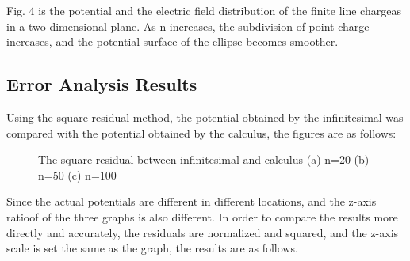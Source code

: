 \documentclass[journal,twocolumn,letterpaper]{IEEEJERM}
\begin{document}
Fig. 4 is the potential and the electric field distribution of the finite line chargeas in a two-dimensional plane. As n increases, the subdivision of point charge increases, and the potential surface of the ellipse becomes smoother. 

\subsection{Error Analysis Results}
Using the square residual method, the potential obtained by the infinitesimal was compared with the potential obtained by the calculus, the figures are as follows:
\begin{figure}[H]   
	\centering	  
	    \label{51}\hfill	  
	\label{52}\hfill
	    \label{53}\hfill	  
	\caption{The square residual between infinitesimal and calculus (a) n=20 (b) n=50 (c) n=100
	}	  
	\label{fig5} 
\end{figure}
Since the actual potentials are different in different locations, and the z-axis ratioof of the three graphs is also different. In order to compare the results more directly and accurately, the residuals are normalized and squared, and the z-axis scale is set the same as the graph, the results are as follows.
\end{document}
